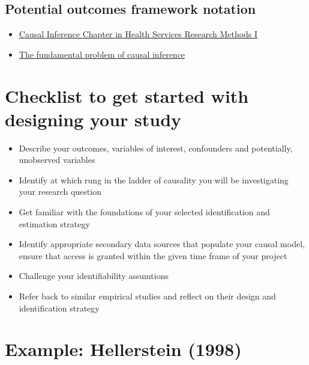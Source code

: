 \documentclass[
]{book}
\providecommand{\tightlist}{%
  \setlength{\itemsep}{0pt}\setlength{\parskip}{0pt}}
\begin{document}
\hypertarget{potential-outcomes-framework-notation}{%
\subsection{Potential outcomes framework
notation}\label{potential-outcomes-framework-notation}}

\begin{itemize}
\tightlist
\item
  \href{https://clas.ucdenver.edu/marcelo-perraillon/teaching/health-services-research-methods-i-hsmp-7607}{Causal
  Inference Chapter in Health Services Research Methods I}
\item
  \href{https://chabefer.github.io/STCI/FPCI.html}{The fundamental
  problem of causal inference}
\end{itemize}

\hypertarget{checklist-to-get-started-with-designing-your-study}{%
\section{Checklist to get started with designing your
study}\label{checklist-to-get-started-with-designing-your-study}}

\begin{itemize}
\tightlist
\item
  Describe your outcomes, variables of interest, confounders and
  potentially, unobserved variables
\item
  Identify at which rung in the ladder of causality you will be
  investigating your research question
\item
  Get familiar with the foundations of your selected identification and
  estimation strategy
\item
  Identify appropriate secondary data sources that populate your causal
  model, ensure that access is granted within the given time frame of
  your project
\item
  Challenge your identifiability assumtions
\item
  Refer back to similar empirical studies and reflect on their design
  and identification strategy
\end{itemize}

\hypertarget{example-hellerstein-1998-1}{%
\section{Example: Hellerstein (1998)}\label{example-hellerstein-1998-1}}
\end{document}

